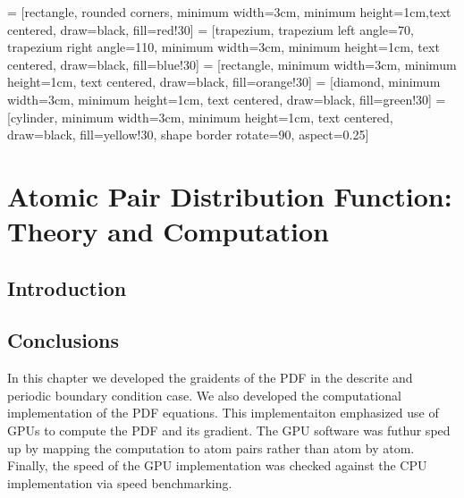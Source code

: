\graphicspath{{./pdf/figures/}}
 = [rectangle, rounded corners, minimum width=3cm, minimum height=1cm,text centered, draw=black, fill=red!30]
 = [trapezium, trapezium left angle=70, trapezium right angle=110, minimum width=3cm, minimum height=1cm, text centered, draw=black, fill=blue!30]
 = [rectangle, minimum width=3cm, minimum height=1cm, text centered, draw=black, fill=orange!30]
 = [diamond, minimum width=3cm, minimum height=1cm, text centered, draw=black, fill=green!30]
\usetikzlibrary{shapes.geometric}
 = [cylinder, minimum width=3cm, minimum height=1cm, text centered, draw=black, fill=yellow!30, shape border rotate=90, aspect=0.25]

\chapter{Atomic Pair Distribution Function: \\Theory and Computation} \label{ch:pdf}
\section{Introduction}




\section{Conclusions}
In this chapter we developed the graidents of the PDF in the descrite and periodic boundary condition case.
We also developed the computational implementation of the PDF equations.
This implementaiton emphasized use of GPUs to compute the PDF and its gradient.
The GPU software was futhur sped up by mapping the computation to atom pairs rather than atom by atom.
Finally, the speed of the GPU implementation was checked against the CPU implementation via speed benchmarking.
